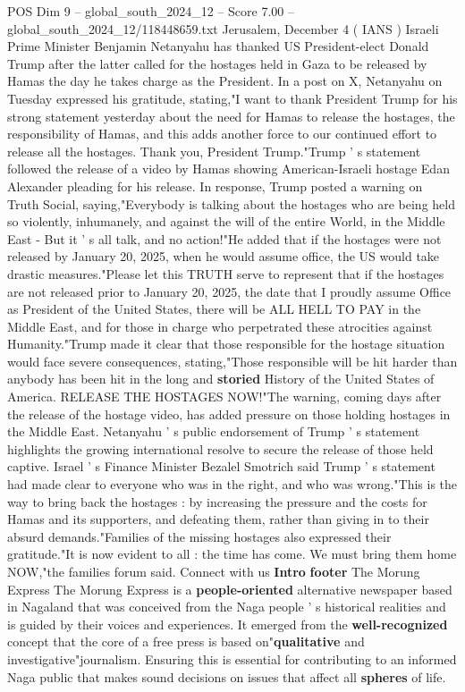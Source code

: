 \begin{textsample}{POS Dim 9 – global\_south\_2024\_12 – Score 7.00 – global\_south\_2024\_12/118448659.txt}  \label{ex:f9_pos_322}
Jerusalem, December 4 ( IANS ) Israeli Prime Minister Benjamin Netanyahu has thanked US President-elect Donald Trump after the latter called for the hostages held in Gaza to be released by Hamas the day he takes charge as the President.
In a post on X, Netanyahu on Tuesday expressed his gratitude, stating,"I want to thank President Trump for his strong statement yesterday about the need for Hamas to release the hostages, the responsibility of Hamas, and this adds another force to our continued effort to release all the hostages.
Thank you, President Trump."Trump ' s statement followed the release of a video by Hamas showing American-Israeli hostage Edan Alexander pleading for his release.
In response, Trump posted a warning on Truth Social, saying,"Everybody is talking about the hostages who are being held so violently, inhumanely, and against the will of the entire World, in the Middle East - But it ' s all talk, and no action!"He added that if the hostages were not released by January 20, 2025, when he would assume office, the US would take drastic measures."Please let this TRUTH serve to represent that if the hostages are not released prior to January 20, 2025, the date that I proudly assume Office as President of the United States, there will be ALL HELL TO PAY in the Middle East, and for those in charge who perpetrated these atrocities against Humanity."Trump made it clear that those responsible for the hostage situation would face severe consequences, stating,"Those responsible will be hit harder than anybody has been hit in the long and \textbf{storied} History of the United States of America.
RELEASE THE HOSTAGES NOW!"The warning, coming days after the release of the hostage video, has added pressure on those holding hostages in the Middle East.
Netanyahu ' s public endorsement of Trump ' s statement highlights the growing international resolve to secure the release of those held captive.
Israel ' s Finance Minister Bezalel Smotrich said Trump ' s statement had made clear to everyone who was in the right, and who was wrong."This is the way to bring back the hostages : by increasing the pressure and the costs for Hamas and its supporters, and defeating them, rather than giving in to their absurd demands."Families of the missing hostages also expressed their gratitude."It is now evident to all : the time has come.
We must bring them home NOW,"the families forum said.
Connect with us \textbf{Intro} \textbf{footer} The Morung Express The Morung Express is a \textbf{people-oriented} alternative newspaper based in Nagaland that was conceived from the Naga people ' s historical realities and is guided by their voices and experiences.
It emerged from the \textbf{well-recognized} concept that the core of a free press is based on"\textbf{qualitative} and investigative"journalism.
Ensuring this is essential for contributing to an informed Naga public that makes sound decisions on issues that affect all \textbf{spheres} of life.

\end{textsample}
